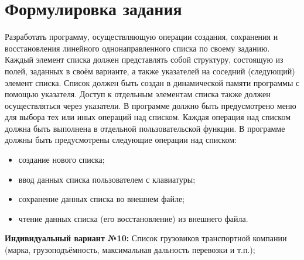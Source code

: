 \section*{Формулировка задания}

Разработать программу, осуществляющую операции создания,
сохранения и восстановления линейного однонаправленного списка по
своему заданию.
Каждый элемент списка должен представлять собой структуру,
состоящую из полей, заданных в своём варианте, а также указателей на
соседний (следующий) элемент списка.
Список должен быть создан в динамической памяти программы с
помощью указателя. Доступ к отдельным элементам списка также должен
осуществляться через указатели.
В программе должно быть предусмотрено меню для выбора тех или
иных операций над списком. Каждая операция над списком должна быть
выполнена в отдельной пользовательской функции.
В программе должны быть предусмотрены следующие операции над
списком:
\begin{itemize}
    \item создание нового списка;
    \item ввод данных списка пользователем с клавиатуры;
    \item сохранение данных списка во внешнем файле;
    \item чтение данных списка (его восстановление) из внешнего файла.
\end{itemize}

\textbf{Индивидуальный вариант №10:}
Список грузовиков транспортной компании (марка, грузоподъёмность,
максимальная дальность перевозки и
т.п.);
